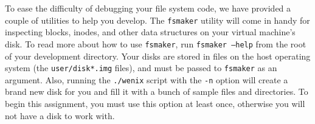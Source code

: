 To ease the difficulty of debugging your file system code, we have provided a couple of utilities to help you develop. The \texttt{fsmaker} utility will come in handy for inspecting blocks, inodes, and other data structures on your virtual machine's disk. To read more about how to use \texttt{fsmaker}, run \texttt{fsmaker --help} from the root of your development directory. Your disks are stored in files on the host operating system (the \texttt{user/disk*.img} files), and must be passed to \texttt{fsmaker} as an argument. Also, running the \texttt{./wenix} script with the \texttt{-n} option will create a brand new disk for you and fill it with a bunch of sample files and directories. To begin this assignment, you must use this option at least once, otherwise you will not have a disk to work with.
